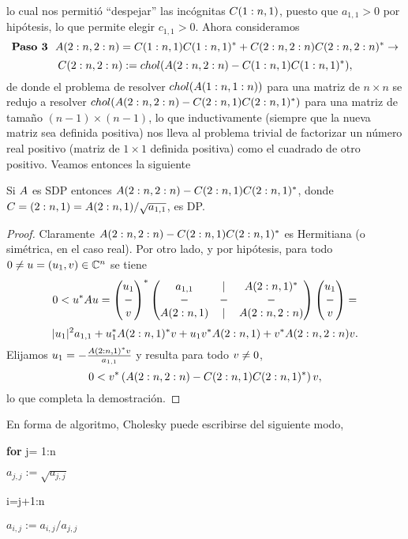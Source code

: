 \begin{tcolorbox}
lo cual nos permitió ``despejar'' las incógnitas $\Cb(1:n,1)$, puesto que
$a_{1,1}>0$ por hipótesis, lo que permite elegir $c_{1,1}>0$. Ahora consideramos
$$
\mbox{\bf Paso 3} \ \ \Ab(2:n,2:n)=\Cb(1:n,1)\Cb(1:n,1)^*+\Cb(2:n,2:n)\Cb(2:n,2:n)^* \to $$
$$\Cb(2:n,2:n):= chol(\Ab(2:n,2:n)-\Cb(1:n,1)\Cb(1:n,1)^*),
$$
de donde el problema de resolver
$chol(\Ab(1:n,1:n))$ para una matriz de $n\times n$  se redujo
a resolver $chol(\Ab(2:n,2:n)-\Cb(2:n,1)\Cb(2:n,1)^*)$ para una matriz de tamaño $(n-1)\times (n-1)$, lo que inductivamente (siempre que la nueva matriz sea definida positiva) nos lleva al problema trivial de factorizar un número real positivo (matriz de $1\times 1$ definida positiva) como el cuadrado de otro positivo. Veamos entonces la siguiente
\tcc
\begin{proposicion}
 Si $\Ab$ es SDP entonces $\Ab(2:n,2:n)-\Cb(2:n,1)\Cb(2:n,1)^*$, donde
 $\Cb=(2:n,1)=\Ab(2:n,1)/\sqrt{a_{1,1}}$, es DP.
\end{proposicion}
\etcc
\begin{proof}
Claramente $\Ab(2:n,2:n)-\Cb(2:n,1)\Cb(2:n,1)^*$ es Hermitiana (o simétrica, en el caso real). Por otro lado, y por hipótesis, para todo $\cero\neq \ub=(u_1,\vb)\in \Cn$ se tiene
 $$
 0<\ub^*\Ab\ub=
 \begin{pmatrix}
  u_1\\
  -\\
  \vb
 \end{pmatrix}^*
\begin{pmatrix}
 a_{1,1}&|&\Ab(2:n,1)^* \\
 -&-&-\\
 \Ab(2:n,1)&|&\Ab(2:n,2:n)
\end{pmatrix}
 \begin{pmatrix}
  u_1\\
  -\\
  \vb
 \end{pmatrix}=
 $$
 $$
 |u_1|^2 a_{1,1}+u_1^{*}\Ab(2:n,1)^{*}\vb +u_1\vb^*\Ab(2:n,1)+\vb^*\Ab(2:n,2:n)\vb.
 $$
 Elijamos $u_1=-\frac{\Ab(2:n,1)^*\vb}{a_{1,1}}$ y resulta para todo $\vb\neq \cero$,
 $$
 0<\vb^*\left( \Ab(2:n,2:n)-\Cb(2:n,1)\Cb(2:n,1)^*\right)\vb,
 $$
 lo que completa la demostración.
\end{proof}
En forma de algoritmo, Cholesky puede
escribirse del siguiente modo,

{\bf for} j= 1:n

\qquad $a_{j,j}:=\sqrt{a_{j,j}}$

 i=j+1:n

\qquad \qquad $a_{i,j}:=a_{i,j}/a_{j,j}$



\end{tcolorbox}

